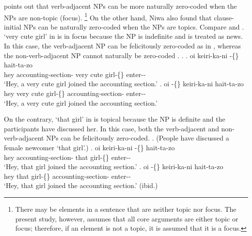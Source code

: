  points out that verb-adjacent NPs
can be more naturally zero-coded
when the NPs are non-topic (focus).%
 \footnote{
 There may be elements in a sentence that are
 neither topic nor focus.
 The present study, however, assumes that all core arguments are
 either topic or focus;
 therefore, if an element is not a topic,
 it is assumed that it is a focus.
 }
On the other hand,
Niwa also found that clause-initial NPs can be naturally zero-coded
when the NPs are topics.
Compare \Next and \NNext.
 `very cute girl' in \Next is in focus
because the NP is indefinite and is treated as news.
In this case,
the verb-adjacent NP can be felicitously zero-coded as in \Next[a],
whereas the non-verb-adjacent NP cannot naturally be zero-coded \Next[b].
%
\ex.
 \ag. oi keiri-ka-ni   -\{\} hait-ta-zo \\
      hey accounting-section- very cute girl-\{\} enter--\\
      `Hey, a very cute girl joined the accounting section.'
 \bg. oi   -\{\} keiri-ka-ni hait-ta-zo \\
      hey very cute girl-\{\} accounting-section- enter--\\
      `Hey, a very cute girl joined the accounting section.'
      \hfill{\cite[293]{niwa06}}

On the contrary,
 `that girl' in \Next is topical
because the NP is definite and the participants have discussed her.
In this case,
both the verb-adjacent and non-verb-adjacent NPs can be
felicitously zero-coded.
%
\ex. (People have discussed a female newcomer  `that girl'.)
 \ag. oi keiri-ka-ni  -\{\} hait-ta-zo \\
      hey accounting-section- that girl-\{\} enter--\\
      `Hey, that girl joined the accounting section.'
 \bg. oi  -\{\} keiri-ka-ni hait-ta-zo \\
      hey that girl-\{\} accounting-section- enter--\\
      `Hey, that girl joined the accounting section.'
      \hfill{(ibid.)}

